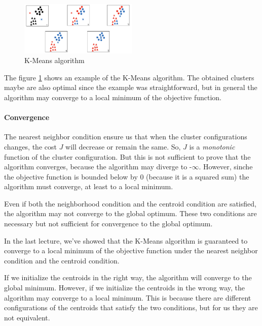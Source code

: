 \begin{figure}
    \centering
    \includegraphics[width=0.5\textwidth]{./figures/chapter_7/lloydexample.png}
    \caption{K-Means algorithm}
    \label{fig:lloydex}
\end{figure}

The figure \ref{fig:lloydex} shows an example of the K-Means algorithm. The obtained clusters maybe are also optimal since the example was straightforward, but in general the algorithm may converge to a local minimum of the objective function.

\paragraph*{Convergence}
The nearest neighbor condition ensure us that when the cluster configurations changes, the cost $J$ will decrease or remain the same. So, $J$ is a \textit{monotonic} function of the cluster configuration.
But this is not sufficient to prove that the algorithm converges, because the algorithm may diverge to -$\infty$. However, sinche the objective function is bounded below by $0$ (because it is a squared sum) the algorithm must converge, at least to a local minimum.

Even if both the neighborhood condition and the centroid condition are satisfied, the algorithm may not converge to the global optimum. These two conditions are necessary but not sufficient for convergence to the global optimum.



In the last lecture, we've showed that the K-Means algorithm is guaranteed to converge to a local minimum of the objective function under the nearest neighbor condition and the centroid condition.

If we initialize the centroids in the right way, the algorithm will converge to the global minimum. However, if we initialize the centroids in the wrong way, the algorithm may converge to a local minimum. This is because there are different configurations of the centroids that satisfy the two conditions, but for us they are not equivalent.


